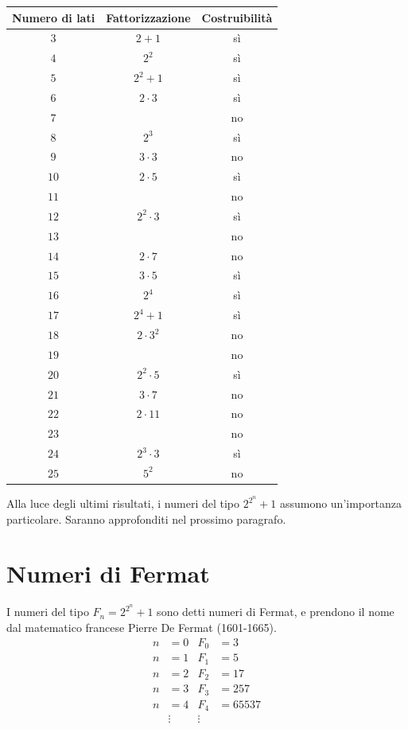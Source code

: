 \begin{center}
\begin{tabular}{c c c}
Numero di lati  & Fattorizzazione & Costruibilità \\
\hline
$3$  &  $2+1$  & sì \\
$4$  &  $2^2$  & sì \\
$5$  &  $2^2+1$  & sì \\
$6$  &  $2\cdot3$  & sì \\
$7$  &                 & no \\
$8$  &  $2^3$  & sì \\
$9$  &  $3\cdot3$  & no \\
$10$  &  $2\cdot5$  & sì \\
$11$  &                    & no \\
$12$  &  $2^2\cdot3$  & sì \\
$13$  &                  & no \\
$14$  &  $2\cdot7$  & no \\
$15$  &  $3\cdot5$  & sì \\
$16$  &  $2^4$  & sì \\
$17$  &  $2^4 + 1$  & sì \\
$18$  &  $2\cdot3^2$  & no \\
$19$  &                & no \\
$20$  &  $2^2\cdot5$  & sì \\
$21$  &  $3\cdot7$  & no \\
$22$  &  $2\cdot11$  & no \\
$23$  &                 & no \\
$24$  &  $2^3\cdot3$  & sì \\
$25$  &  $5^2$  & no \\
\hline
\end{tabular}
\end{center}

\noindent
Alla luce degli ultimi risultati, i numeri del tipo $2^{2^n} + 1$ assumono un'importanza particolare. Saranno approfonditi nel prossimo paragrafo.


\section{Numeri di Fermat}

I numeri del tipo $F_n = 2^{2^{n}} +1$ sono detti numeri di Fermat, e prendono il nome dal matematico francese Pierre De Fermat (1601-1665).
\begin{align*}
n &= 0 &F_0 &= 3\\
n &= 1 &F_1 &= 5\\
n &= 2 &F_2 &= 17\\
n &= 3 &F_3 &= 257\\
n &= 4 &F_4 &= 65537 \\
& \vdots & \vdots
\end{align*}

